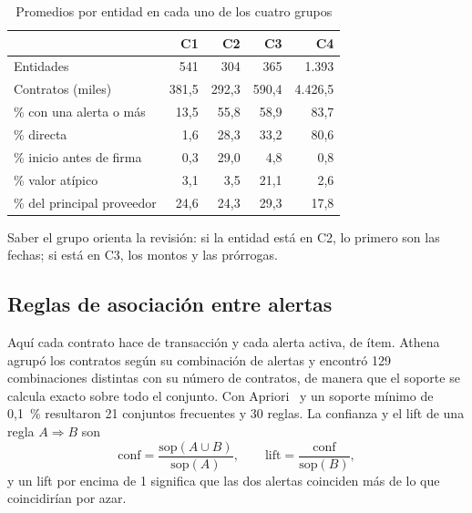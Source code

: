 \begin{table}[!htbp]
\centering
\caption{Promedios por entidad en cada uno de los cuatro grupos}
\label{mineria:tab:clusters}
\footnotesize
\begin{tabular}{@{}lrrrr@{}}
\toprule
 & C1 & C2 & C3 & C4 \\
\midrule
Entidades & 541 & 304 & 365 & 1.393 \\
Contratos (miles) & 381,5 & 292,3 & 590,4 & 4.426,5 \\
\% con una alerta o más & 13,5 & 55,8 & 58,9 & 83,7 \\
\% directa & 1,6 & 28,3 & 33,2 & 80,6 \\
\% inicio antes de firma & 0,3 & 29,0 & 4,8 & 0,8 \\
\% valor atípico & 3,1 & 3,5 & 21,1 & 2,6 \\
\% del principal proveedor & 24,6 & 24,3 & 29,3 & 17,8 \\
\bottomrule
\end{tabular}
\end{table}

Saber el grupo orienta la revisión: si la entidad está en C2, lo primero son las fechas; si está en C3, los montos y las prórrogas.

\subsection{Reglas de asociación entre alertas}
\label{mineria:sec:apriori}
Aquí cada contrato hace de transacción y cada alerta activa, de ítem. Athena agrupó los contratos según su combinación de alertas y encontró 129 combinaciones distintas con su número de contratos, de manera que el soporte se calcula exacto sobre todo el conjunto. Con Apriori~\cite{agrawal1994} y un soporte mínimo de 0,1~\% resultaron 21 conjuntos frecuentes y 30 reglas. La confianza y el lift de una regla $A\Rightarrow B$ son
\begin{equation}
\mathrm{conf}=\frac{\mathrm{sop}(A\cup B)}{\mathrm{sop}(A)},\qquad
\mathrm{lift}=\frac{\mathrm{conf}}{\mathrm{sop}(B)} ,
\end{equation}
y un lift por encima de 1 significa que las dos alertas coinciden más de lo que coincidirían por azar.

